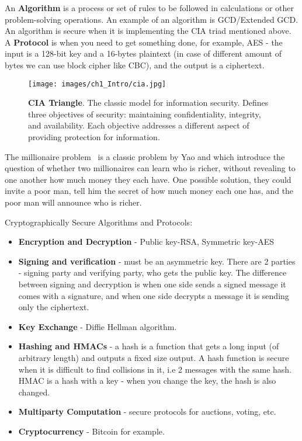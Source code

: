 An \textbf{Algorithm} is a process or set of rules to be followed in
calculations or other problem-solving operations. An example of an algorithm is
GCD/Extended GCD. An algorithm is secure when it is implementing the CIA triad
mentioned above. A \textbf{Protocol} is when you need to get something done, for
example, AES -  the input is a 128-bit key and a 16-bytes plaintext (in case of
different amount of bytes we can use block cipher like CBC), and the output is a ciphertext.

\begin{figure}
    \centering
    \texttt{[image: images/ch1\_Intro/cia.jpg]}
    \caption{\textbf{CIA Triangle}. The classic model for information security. Defines three objectives of security: maintaining confidentiality, integrity, and availability. Each objective addresses a different aspect of providing protection for information.}
    \label{fig:CIA}
\end{figure}

The millionaire problem~\cite{lin2005efficient} is a classic problem by Yao and
which introduce the question of whether two millionaires can learn who is richer, 
without revealing to one another how much money they each have. 
One possible solution, they could invite a poor man, tell him the secret of
how much money each one has, and the poor man will announce who is richer.  

Cryptographically Secure Algorithms and Protocols:
\begin{itemize}
    \item \textbf{Encryption and Decryption} - Public key-RSA, Symmetric key-AES
    \item \textbf{Signing and verification} - must be an asymmetric key. There
    are 2 parties - signing party and verifying party, who gets the public key.
    The difference between signing and decryption is when one side sends a
    signed message it comes with a signature, and when one side decrypts a
    message it is sending only the ciphertext.
    \item \textbf{Key Exchange} - Diffie Hellman algorithm.
    \item \textbf{Hashing and HMACs} - a hash is a function that gets a long
    input (of arbitrary length) and outputs a fixed size output. A hash
    function is secure when it is difficult to find collisions in it, i.e 2 messages with
    the same hash. HMAC is a hash with a key - when you change the key, the hash
    is also changed.
    \item \textbf{Multiparty Computation} - secure protocols for auctions, voting, etc.
    \item \textbf{Cryptocurrency} - Bitcoin for example.
\end{itemize}


